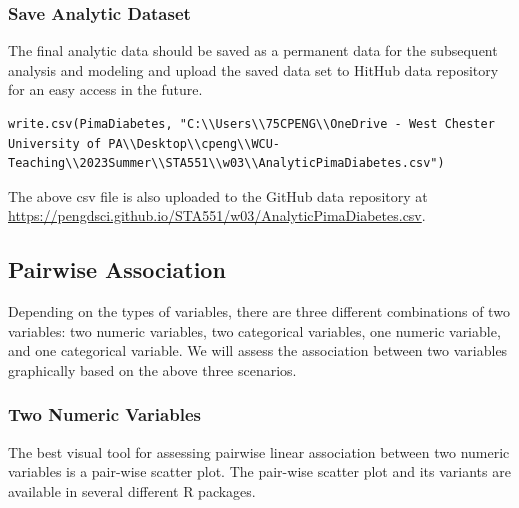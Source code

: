 \documentclass[
]{book}
\begin{document}
\hypertarget{save-analytic-dataset}{%
\subsubsection{Save Analytic Dataset}\label{save-analytic-dataset}}

The final analytic data should be saved as a permanent data for the subsequent analysis and modeling and upload the saved data set to HitHub data repository for an easy access in the future.

\begin{verbatim}
write.csv(PimaDiabetes, "C:\\Users\\75CPENG\\OneDrive - West Chester University of PA\\Desktop\\cpeng\\WCU-Teaching\\2023Summer\\STA551\\w03\\AnalyticPimaDiabetes.csv")
\end{verbatim}

The above csv file is also uploaded to the GitHub data repository at \url{https://pengdsci.github.io/STA551/w03/AnalyticPimaDiabetes.csv}.

\hypertarget{pairwise-association}{%
\subsection{Pairwise Association}\label{pairwise-association}}

Depending on the types of variables, there are three different combinations of two variables: two numeric variables, two categorical variables, one numeric variable, and one categorical variable. We will assess the association between two variables graphically based on the above three scenarios.

\hypertarget{two-numeric-variables-1}{%
\subsubsection{Two Numeric Variables}\label{two-numeric-variables-1}}

The best visual tool for assessing pairwise linear association between two numeric variables is a pair-wise scatter plot. The pair-wise scatter plot and its variants are available in several different R packages.
\end{document}
